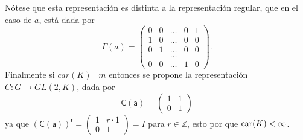 \begin{ejemplo}
Nótese que esta representación es distinta a la representación regular, que en el caso de $a$, está dada por 
\begin{equation*} \mathsf{\Gamma}(a) = \begin{pmatrix}
0 & 0 & \dots & 0 & 1 \\
1 & 0 & \dots & 0 & 0\\
0 & 1 & \dots & 0 & 0\\
 &  &  \dots &  &  \\
 0 & 0 & \dots & 1 & 0
\end{pmatrix}. \end{equation*}
Finalmente si $car(K) \mid m$ entonces se propone la representación $C \colon G \to GL(2,K)$, dada por
\begin{equation*}
\mathsf{C(a)} = \begin{pmatrix}
1 & 1\\
0 & 1
\end{pmatrix} 
\end{equation*}
 ya que $\mathsf{(C(a))^r} = \begin{pmatrix}
1 & r\cdot 1\\
0 & 1
\end{pmatrix} = I$ para $r \in \mathds{Z}$, esto por que $\operatorname{car}(K) < \infty $.
\end{ejemplo} 

